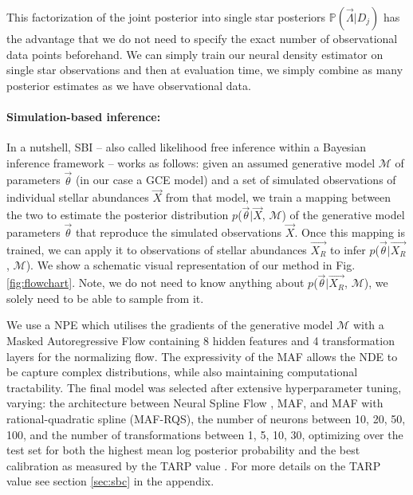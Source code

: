 \documentclass{aa}
\begin{document}
This factorization of the joint posterior into single star posteriors $\mathbb{P}(\vec\Lambda|D_j)$ has the advantage that we do not need to specify the exact number of observational data points beforehand. We can simply train our neural density estimator on single star observations and then at evaluation time, we simply combine as many posterior estimates as we have observational data.


\paragraph{Simulation-based inference:}
In a nutshell, SBI \citep[e.g.][]{Cranmer2020,Papamakarios:2021,Gloeckler2024AllinoneSI} -- also called likelihood free inference within a Bayesian inference framework -- works as follows: given an assumed generative model $\mathcal{M}$ of parameters $\Vec{\theta}$ (in our case a GCE model) and a set of simulated observations of individual stellar abundances $\Vec{X}$ from that model, we train a mapping between the two to estimate the posterior distribution $p$($\Vec{\theta}|\Vec{X}$, $\mathcal{M}$) of the generative model parameters $\Vec{\theta}$ that reproduce the simulated observations $\Vec{X}$. Once this mapping is trained, we can apply it to observations of stellar abundances $\Vec{X_R}$ to infer $p$($\Vec{\theta}|\Vec{X_R}$, $\mathcal{M}$). We show a schematic visual representation of our method in Fig. \ref{fig:flowchart}. Note, we do not need to know anything about $p$($\Vec{\theta}|\Vec{X_R}$, $\mathcal{M}$), we solely need to be able to sample from it.

We use a NPE \citep{zeghal2022neuralposteriorestimationdifferentiable} which utilises the gradients of the generative model $\mathcal{M}$ with a Masked Autoregressive Flow 
\citep[MAF;][]{papamakarios2018maskedautoregressiveflowdensity} 
containing 8 hidden features and 4 transformation layers for the normalizing flow. 
The expressivity of the MAF allows the NDE to be capture complex distributions, while also maintaining computational tractability. The final model was selected after extensive hyperparameter tuning, varying: the architecture between Neural Spline Flow \citep[NSF;][]{durkan2019neuralsplineflows}, MAF, and MAF with rational-quadratic spline (MAF-RQS), the number of neurons between {10, 20, 50, 100}, and the number of transformations between {1, 5, 10, 30}, optimizing over the test set for both the highest mean log posterior probability and the best calibration as measured by the TARP value \citep{Lemos2023}. For more details on the TARP value see section \ref{sec:sbc} in the appendix.
\end{document}

